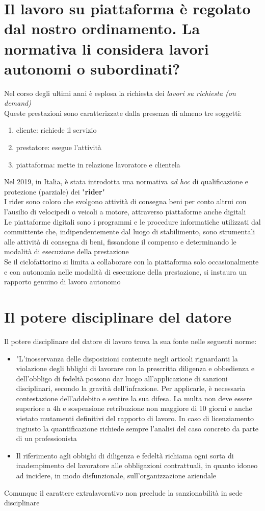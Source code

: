 \documentclass[8pt,oneside,a4paper]{article}
\begin{document}
	\section{Il lavoro su piattaforma è regolato dal nostro ordinamento. La normativa li considera lavori autonomi o subordinati?}
	Nel corso degli ultimi anni è esplosa la richiesta dei \textit{lavori su richiesta (on demand)}\\
	Queste prestazioni sono caratterizzate dalla presenza di almeno tre soggetti:
	\begin{enumerate}
		\item cliente: richiede il servizio
		\item prestatore: esegue l'attività
		\item piattaforma: mette in relazione lavoratore e clientela
	\end{enumerate}
	Nel 2019, in Italia, è stata introdotta una normativa \textit{ad hoc} di qualificazione e protezione (parziale) dei "\textbf{rider}"\\
	I rider sono coloro che svolgono attività di consegna beni per conto altrui con l'ausilio di velocipedi o veicoli a motore, attraverso piattaforme anche digitali\\
	Le piattaforme digitali sono i programmi e le procedure informatiche utilizzati dal committente che, indipendentemente dal luogo di stabilimento, sono strumentali alle attività di consegna di beni, fissandone il compenso e determinando le modalità di esecuzione della prestazione\\
	Se il ciclofattorino si limita a collaborare con la piattaforma solo occasionalmente e con autonomia nelle modalità di esecuzione della prestazione, si instaura un rapporto genuino di lavoro autonomo
	\section{Il potere disciplinare del datore}
	Il potere disciplinare del datore di lavoro trova la sua fonte nelle seguenti norme:
	\begin{itemize}
		\item "L'inosservanza delle disposizioni contenute negli articoli riguardanti la violazione degli bblighi di lavorare con la prescritta diligenza e obbedienza e dell'obbligo di fedeltà possono dar luogo all'applicazione di sanzioni disciplinari, secondo la gravità dell'infrazione. Per applicarle, è necessaria contestazione dell'addebito e sentire la sua difesa. La multa non deve essere superiore a 4h e sospensione retribuzione non maggiore di 10 giorni e anche vietato mutamenti definitivi del rapporto di lavoro. In caso di licenziamento ingiusto la quantificazione richiede sempre l'analisi del caso concreto da parte di un professionista
		\item Il riferimento agli obbighi di diligenza e fedeltà richiama ogni sorta di inadempimento del lavoratore alle obbligazioni contrattuali, in quanto idoneo ad incidere, in modo disfunzionale, sull'organizzazione aziendale
	\end{itemize}
	Comunque il carattere extralavorativo non preclude la sanzionabilità in sede disciplinare
\end{document}

